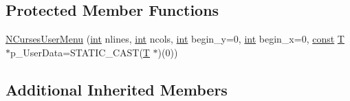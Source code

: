 \subsection*{Protected Member Functions}
\begin{DoxyCompactItemize}
\item 
\hyperlink{class_n_curses_user_menu_ad881a635996f209e5bf4c1696f04c652}{N\-Curses\-User\-Menu} (\hyperlink{term__entry_8h_ad65b480f8c8270356b45a9890f6499ae}{int} nlines, \hyperlink{term__entry_8h_ad65b480f8c8270356b45a9890f6499ae}{int} ncols, \hyperlink{term__entry_8h_ad65b480f8c8270356b45a9890f6499ae}{int} begin\-\_\-y=0, \hyperlink{term__entry_8h_ad65b480f8c8270356b45a9890f6499ae}{int} begin\-\_\-x=0, \hyperlink{term__entry_8h_a57bd63ce7f9a353488880e3de6692d5a}{const} \hyperlink{curses_8priv_8h_a5ef253115820acf7d27f3c5c3b02a0f0}{T} $\ast$p\-\_\-\-User\-Data=S\-T\-A\-T\-I\-C\-\_\-\-C\-A\-S\-T(\hyperlink{curses_8priv_8h_a5ef253115820acf7d27f3c5c3b02a0f0}{T} $\ast$)(0))
\end{DoxyCompactItemize}
\subsection*{Additional Inherited Members}


